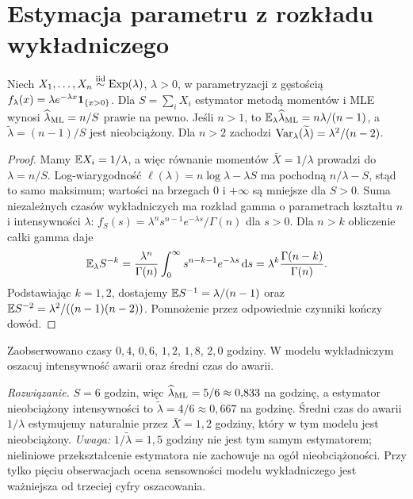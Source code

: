 \section{Estymacja parametru z rozkładu wykładniczego}
\begin{twierdzenie}
\label{thm:exp-rate}
Niech $X_1,\ldots,X_n\mathrel{\overset{\mathrm{iid}}\sim}\operatorname{Exp}(\lambda)$,
$\lambda>0$, w parametryzacji z gęstością
$f_\lambda(x)=\lambda e^{-\lambda x}\mathbf 1_{\{x>0\}}$.
Dla $S=\sum_iX_i$ estymator metodą momentów i MLE wynosi
$\widehat\lambda_{\rm ML}=n/S$ prawie na pewno.
Jeśli $n>1$, to $\mathbb E_\lambda\widehat\lambda_{\rm ML}
=n\lambda/(n-1)$, a $\widetilde\lambda=(n-1)/S$ jest
nieobciążony. Dla $n>2$ zachodzi
$\operatorname{Var}_\lambda(\widetilde\lambda)=\lambda^2/(n-2)$.
\end{twierdzenie}
\begin{proof}
Mamy $\mathbb E X_i=1/\lambda$, a więc równanie momentów
$\bar X=1/\lambda$ prowadzi do $\lambda=n/S$.
Log-wiarygodność $\ell(\lambda)=n\log\lambda-\lambda S$
ma pochodną $n/\lambda-S$, stąd to samo maksimum; wartości
na brzegach $0$ i $+\infty$ są mniejsze dla $S>0$.
Suma niezależnych czasów wykładniczych ma rozkład gamma o
parametrach kształtu $n$ i intensywności $\lambda$:
$f_S(s)=\lambda^n s^{n-1}e^{-\lambda s}/\Gamma(n)$ dla $s>0$.
Dla $n>k$ obliczenie całki gamma daje
\[
\mathbb E_\lambda S^{-k}
=\frac{\lambda^n}{\Gamma(n)}
 \int_0^\infty s^{n-k-1}e^{-\lambda s}\,\mathrm d s
=\lambda^k\frac{\Gamma(n-k)}{\Gamma(n)}.
\]
Podstawiając $k=1,2$, dostajemy
$\mathbb E S^{-1}=\lambda/(n-1)$ oraz
$\mathbb E S^{-2}=\lambda^2/((n-1)(n-2))$.
Pomnożenie przez odpowiednie czynniki kończy dowód.
\end{proof}

\begin{zadanie}
Zaobserwowano czasy $0{,}4$, $0{,}6$, $1{,}2$, $1{,}8$, $2{,}0$
godziny. W modelu wykładniczym oszacuj intensywność awarii
oraz średni czas do awarii.
\par\emph{Rozwiązanie.} $S=6$ godzin, więc
$\widehat\lambda_{\rm ML}=5/6\approx0{,}833$ na godzinę,
a estymator nieobciążony intensywności to
$\widetilde\lambda=4/6\approx0{,}667$ na godzinę.
Średni czas do awarii $1/\lambda$ estymujemy naturalnie przez
$\bar X=1{,}2$ godziny, który w tym modelu jest nieobciążony.
\emph{Uwaga:} $1/\widetilde\lambda=1{,}5$ godziny nie jest tym
samym estymatorem; nieliniowe przekształcenie estymatora
nie zachowuje na ogół nieobciążoności. Przy tylko pięciu
obserwacjach ocena sensowności modelu wykładniczego jest
ważniejsza od trzeciej cyfry oszacowania.
\end{zadanie}

